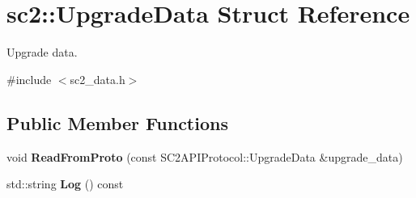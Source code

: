 \hypertarget{structsc2_1_1_upgrade_data}{}\section{sc2\+:\+:Upgrade\+Data Struct Reference}
\label{structsc2_1_1_upgrade_data}


Upgrade data.  




{\ttfamily \#include $<$sc2\+\_\+data.\+h$>$}

\subsection*{Public Member Functions}
\begin{DoxyCompactItemize}
\item 
\mbox{\label{structsc2_1_1_upgrade_data_a14c5db44ff8de245a4cd01592c3e6eeb}} 
void {\bfseries Read\+From\+Proto} (const S\+C2\+A\+P\+I\+Protocol\+::\+Upgrade\+Data \&upgrade\+\_\+data)
\item 
\mbox{\label{structsc2_1_1_upgrade_data_ab9641667d3a1ba0bb61ebd892a3fa8a5}} 
std\+::string {\bfseries Log} () const
\end{DoxyCompactItemize}
